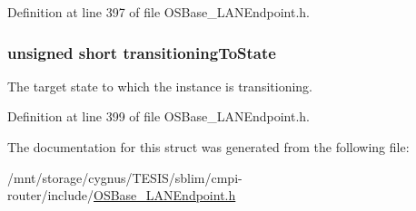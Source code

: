Definition at line 397 of file OSBase\_\-LANEndpoint.h.\hypertarget{struct_l_a_n_endpoint_adcee671f36f8f587fd4ea48186bde364}{
\subsubsection[{transitioningToState}]{\setlength{\rightskip}{0pt plus 5cm}unsigned short {\bf transitioningToState}}}
\label{struct_l_a_n_endpoint_adcee671f36f8f587fd4ea48186bde364}
The target state to which the instance is transitioning. 

Definition at line 399 of file OSBase\_\-LANEndpoint.h.

The documentation for this struct was generated from the following file:\begin{DoxyCompactItemize}
\item 
/mnt/storage/cygnus/TESIS/sblim/cmpi-\/router/include/\hyperlink{_o_s_base___l_a_n_endpoint_8h}{OSBase\_\-LANEndpoint.h}\end{DoxyCompactItemize}
